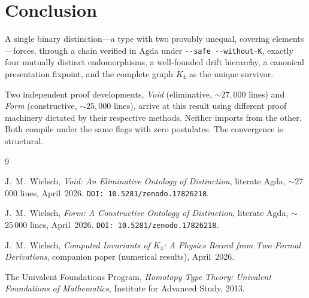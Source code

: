 \documentclass[11pt,a4paper]{article}
\theoremstyle{definition}
\begin{document}
\section{Conclusion}
\label{sec:conclusion}

A single binary distinction---a type with two provably unequal, covering
elements---forces, through a chain verified in Agda under
\texttt{-{}-safe -{}-without-K}, exactly four mutually distinct
endomorphisms, a well-founded drift hierarchy, a canonical presentation
fixpoint, and the complete graph $K_4$ as the unique survivor.

Two independent proof developments, \textit{Void} (eliminative,
${\sim}27{,}000$ lines) and \textit{Form} (constructive,
${\sim}25{,}000$ lines), arrive at this result using different proof
machinery dictated by their respective methods.  Neither imports from
the other.  Both compile under the same flags with zero postulates.
The convergence is structural.

\begin{thebibliography}{9}

J.~M.~Wielsch,
\textit{Void: An Eliminative Ontology of Distinction},
literate Agda, $\sim$27\,000 lines, April~2026.
\texttt{DOI:~10.5281/zenodo.17826218}.

J.~M.~Wielsch,
\textit{Form: A Constructive Ontology of Distinction},
literate Agda, $\sim$25\,000 lines, April~2026.
\texttt{DOI:~10.5281/zenodo.17826218}.

J.~M.~Wielsch,
\textit{Computed Invariants of $K_4$: A Physics Record from Two Formal Derivations},
companion paper (numerical results), April~2026.

The Univalent Foundations Program,
\textit{Homotopy Type Theory: Univalent Foundations of Mathematics},
Institute for Advanced Study, 2013.

\end{thebibliography}
\end{document}
